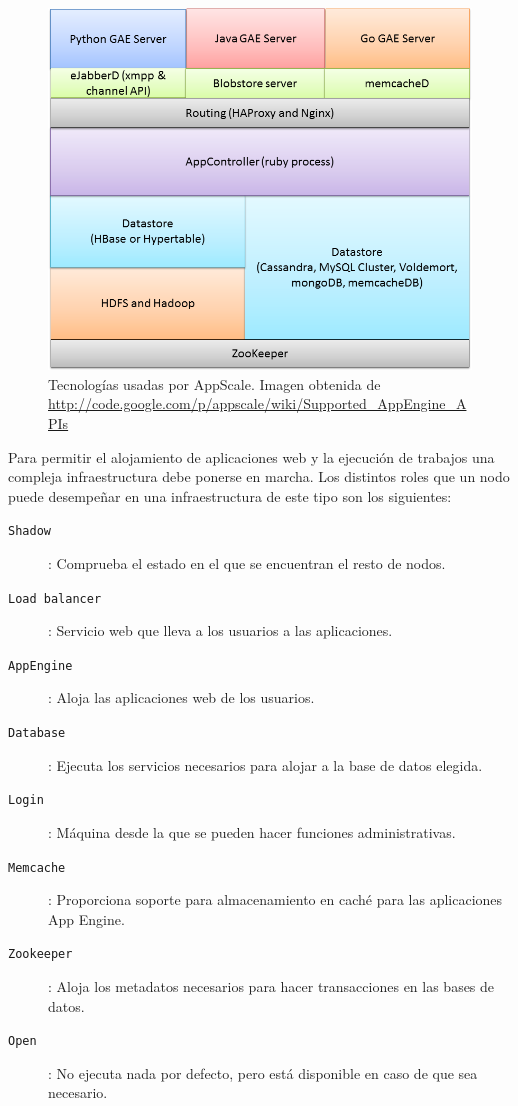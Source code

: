 \begin{figure} [!htbp]
  \centering
  \includegraphics[width=13.5cm]{imagenes/AppScale_Stack.png}
  \caption{Tecnologías usadas por AppScale. Imagen obtenida de \url{http://code.google.com/p/appscale/wiki/Supported_AppEngine_APIs}}
\label{figure:tecnologias-appscale}
\end{figure}

Para permitir el alojamiento de aplicaciones web y la ejecución de trabajos una compleja infraestructura debe ponerse en marcha. Los distintos roles que un nodo puede desempeñar en una infraestructura de este tipo son los siguientes:

\begin{description}
\item[\texttt{Shadow}]: Comprueba el estado en el que se encuentran el resto de nodos.
\item[\texttt{Load balancer}]: Servicio web que lleva a los usuarios a las aplicaciones.
\item[\texttt{AppEngine}]: Aloja las aplicaciones web de los usuarios.
\item[\texttt{Database}]: Ejecuta los servicios necesarios para alojar a la base de datos elegida.
\item[\texttt{Login}]: Máquina desde la que se pueden hacer funciones administrativas.
\item[\texttt{Memcache}]: Proporciona soporte para almacenamiento en caché para las aplicaciones App Engine.
\item[\texttt{Zookeeper}]: Aloja los metadatos necesarios para hacer transacciones en las bases de datos.
\item[\texttt{Open}]: No ejecuta nada por defecto, pero está disponible en caso de que sea necesario.
\end{description}

